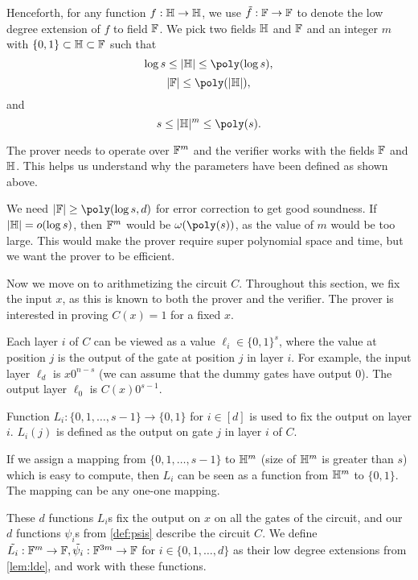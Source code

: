 Henceforth, for any function $f: \mathbb{H} \to \mathbb{H}$, we use $\tilde{f}:\mathbb{F} \to \mathbb{F}$ to
denote the low degree extension of $f$ to field $\mathbb{F}$. We pick two fields $\mathbb{H}$
and $\mathbb{F}$ and an integer $m$ with $\{0,1\} \subset \mathbb{H} \subset \mathbb{F}$ such that
\begin{equation}
  \log s \leq |\fH| \leq \poly(\log s),
\end{equation}
\begin{equation}
  |\F| \leq \poly(|\fH|),
\end{equation}
and
\begin{equation}
  s \leq |\fH|^m \leq \poly(s).
\end{equation}

The prover needs to operate over $\mathbb{F}^m$ and the verifier works with the fields
$\mathbb{F}$ and $\mathbb{H}$. This helps us understand why the parameters have been defined
as shown above.

We need $|\F| \geq \poly(\log s, d)$ for error correction to get good
soundness. If $|\mathbb{H}| = o(\log s)$, then $\mathbb{F}^m$ would be $\omega(\poly(s))$, as
the value of $m$ would be too large. This would make the prover require super
polynomial space and time, but we want the prover to be efficient.

Now we move on to arithmetizing the circuit $C$. Throughout this section, we
fix the input $x$, as this is known to both the prover and the verifier. The
prover is interested in proving $C(x)=1$ for a fixed $x$.

Each layer $i$ of $C$ can be viewed as a value $\ell_i \in \{0,1\}^{s}$, where
the value at position $j$ is the output of the gate at position $j$ in layer
$i$. For example, the input layer $\ell_d$ is $x0^{n-s}$ (we can assume that
the dummy gates have output 0). The output layer $\ell_0$ is $C(x)0^{s-1}$.

Function $L_i:\{0,1, \ldots, s-1\} \rightarrow \{0,1\}$ for $i \in [d]$ is used
to fix the output on layer $i$. $L_i(j)$ is defined as the output on gate $j$
in layer $i$ of $C$.

If we assign a mapping from $\{0,1, \ldots, s-1\}$ to $\mathbb{H}^m$ (size of $\mathbb{H}^m$
is greater than $s$) which is easy to compute, then $L_i$ can be seen as a
function from $\mathbb{H}^m$ to $\{0,1\}$. The mapping can be any one-one mapping.

These $d$ functions $L_i$s fix the output on $x$ on all the gates of the
circuit, and our $d$ functions $\psi_i$s from \cref{def:psis} describe the
circuit $C$. We define $\tilde{L_i}: \mathbb{F}^m \rightarrow \mathbb{F}, \tilde{\psi_i}:
\mathbb{F}^{3m} \rightarrow \mathbb{F}$ for $i\in \{0,1,\ldots, d\}$ as their low degree
extensions from \cref{lem:lde}, and work with these functions.


